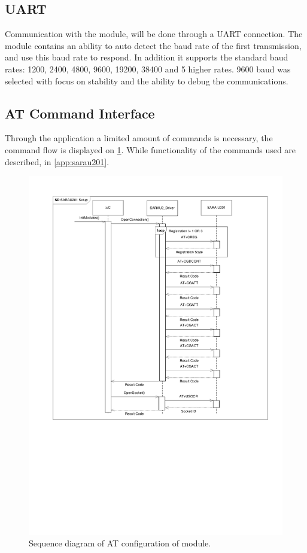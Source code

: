 \subsection{UART}
Communication with the \SARA module, will be done through a UART connection. The module contains an ability to auto detect the baud rate of the first transmission, and use this baud rate to respond. In addition it supports the standard baud rates: \num{1200}, \num{2400}, \num{4800}, \num{9600}, \num{19200}, \num{38400} and 5 higher rates. \num{9600} baud was selected with focus on stability and the ability to debug the communications.

\subsection{AT Command Interface}
Through the application a limited amount of commands is necessary, the command flow is displayed on \cref{fig:SD:configConnection}. While functionality of the commands used are described, in \cref{app:sarau201}.

\begin{figure}
	\centering
	\includegraphics[width=0.9\linewidth, clip, trim={2cm 9cm 1cm 1cm}]{gfx/Design/GSMSetupConnection.pdf}
	\caption{Sequence diagram of AT configuration of \SARA module.}
	\label{fig:SD:configConnection}
\end{figure}

